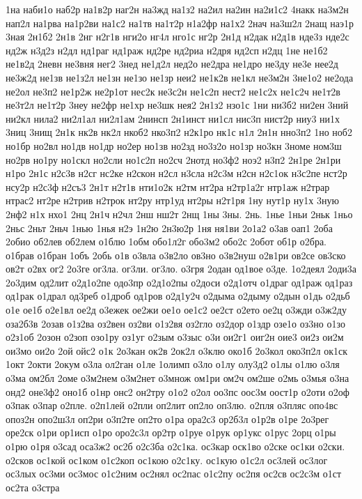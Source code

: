 {1на
наби1о
наб2р
на1в2р
наг2н
на3жд
на1з2
на2ил
на2ин
на2и1с2
4накк
на3м2н
нап2л
на1рва
на1р2ви
на1с2
на1тв
на1т2р
н1а2фр
на1х2
2нач
на3ш2л
2нащ
наэ1р
3ная
2н1б2
2н1в
2нг
н2г1в
нги2о
нг4л
нго1с
нг2р
2н1д
н2дак
н2д1в
нде3з
нде2с
нд2ж
н3д2з
н2дл
нд1раг
нд1раж
нд2ре
нд2риа
н2дря
нд2сп
н2дц
1не
не1б2
не1в2д
2невн
не3вня
нег2
3нед
не1д2л
нед2о
не2дра
не1дро
не3ду
не3е
нее2д
не3ж2д
не1зв
не1з2л
не1зн
не1зо
не1зр
неи2
не1к2в
не1кл
не3м2н
3не1о2
не2ода
не2ол
не3п2
не1р2ж
не2р1от
нес2к
не3с2н
не1с2п
нест2
не1с2х
не1с2ч
не1т2в
не3т2л
не1т2р
3неу
не2фр
не1хр
не3шк
нея2
2н1з2
нзо1с
1ни
ни3б2
ни2ен
3ний
ни2кл
нила2
ни2л1ал
ни2л1ам
2нинсп
2н1инст
ни1сл
нис3п
нист2р
ниу3
ни1х
3ниц
3нищ
2н1к
нк2в
нк2л
нкоб2
нко3п2
н2к1ро
нк1с
н1л
2н1н
нно3п2
1но
ноб2
но1бр
но2вл
но1дв
но1др
но2ер
но1зв
но2зд
но3з2о
но1зр
но3кн
3номе
ном3ш
но2рв
но1ру
но1скл
но2сли
но1с2п
но2сч
2нотд
но3ф2
ноэ2
н3п2
2н1ре
2н1ри
н1ро
2н1с
н2с3в
н2сг
нс2ке
н2скон
н2сл
н3сла
н2с3м
н2сн
н2с1ок
н3с2пе
нст2р
нсу2р
н2с3ф
н2съ3
2н1т
н2т1в
нти1о2к
н2тм
нт2ра
н2тр1а2г
нтр1аж
н2трар
нтрас2
нт2ре
н2трив
н2трок
нт2ру
нтр1уд
нт2ры
н2т1ря
1ну
нут1р
ну1х
3ную
2нф2
н1х
нхо1
2нц
2н1ч
н2чл
2нш
нш2т
2нщ
1ны
3ны.
2нь.
1нье
1ньи
2ньк
1ньо
2ньс
2ньт
2ньч
1нью
1нья
н2э
1н2ю
2н3ю2р
1ня
ня1ви
2о1а2
о3ав
оап1
2оба
2обио
об2лев
об2лем
о1блю
1обм
обо1л2г
обо3м2
обо2с
2обот
об1р
о2бра.
о1брав
о1бран
1объ
2обь
о1в
о3вла
о3в2ло
ов3но
о3в2нуш
о2в1ри
ов2се
ов3ско
ов2т
о2вх
ог2
2о3ге
ог3ла.
ог3ли.
ог3ло.
о3гря
2одан
од1вое
о3де.
1о2деял
2оди3а
2о3дим
од2лит
о2д1о2пе
одо3пр
о2д1о2пы
о2доси
о2д1отч
о1драг
од1раж
од1раз
од1рак
о1драл
од3реб
о1дроб
од1ров
о2д1у2ч
о2дыма
о2дыму
о2дын
о1дь
о2дьб
о1е
ое1б
о2е1вл
ое2д
о3ежек
ое2жи
ое1о
ое1с2
ое2ст
о2ето
ое2ц
о3жди
о3ж2ду
оза2б3в
2озав
о1з2ва
оз2вен
оз2ви
о1з2вя
оз2гло
оз2дор
о1здр
озе1о
оз3но
о1зо
о2з1об
2озон
о2зоп
озо1ру
оз1уг
о2зым
о3зыс
о3и
ои2г1
оиг2н
оие3
ои2з
ои2м
ои3мо
ои2о
2ой
ойс2
о1к
2о3кан
ок2в
2ок2л
о3клю
око1б
2о3кол
око3п2л
ок1ск
1окт
2окти
2окум
о3ла
ол2ган
о1ле
1олимп
о3ло
о1лу
олу3д2
о1лы
о1лю
о3ля
о3ма
ом2бл
2оме
о3м2нем
о3м2нет
о3множ
ом1ри
ом2ч
ом2ше
о2мь
о3мья
о3на
онд2
оне3ф2
оно1б
о1нр
онс2
он2тру
о1о2
о2ол
оо3пс
оос3м
оост1р
о2оти
о2оф
о3пак
о3пар
о2пле.
о2п1лей
о2пли
оп2лит
оп2ло
оп3лю.
о2пля
о3пляс
опо4вс
опоз2н
опо2ш3л
оп2ри
о3п2те
оп2то
о1ра
ора2с3
ор2б3л
о1р2в
о1ре
2о3рег
оре2ск
о1ри
ор1исп
о1ро
оро2с3л
ор2тр
о1руе
о1рук
ор1укс
о1рус
2орц
о1ры
о1рю
о1ря
о3сад
оса3ж2
ос2б
о2с3ба
о2с1ка.
ос3кар
оск1во
о2ске
ос1ки
о2ски.
о2сков
ос1кой
ос1ком
о1с2коп
ос1кою
о2с1ку.
ос1кую
о1с2л
ос3лей
ос3лог
ос3лых
ос3ми
ос3мос
о1с2ним
ос2нял
ос2пас
о1с2пу
ос2пя
ос2св
ос2с3м
о1ст
ос2та
о3стра
}
